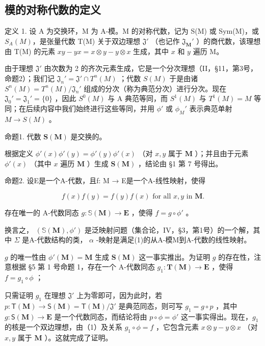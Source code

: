 \subsection{模的对称代数的定义}

定义 1. 设 A 为交换环，M 为 A-模。M 的对称代数，记为 S(M) 或 Sym(M)，或 \(S_{A}(M)\)，是张量代数 T(M) 关于双边理想 \(\mathfrak{J}'\) （也记作 \(\mathfrak{J}_{\mathbf{M}}'\) ）的商代数，该理想由 T(M) 的元素 \(xy - yx = x \otimes y - y \otimes x\) 生成，其中 \(x\) 和 \(y\) 遍历 M。

由于理想 \(\mathfrak{J}'\) 由次数为 2 的齐次元素生成，它是一个分次理想（II，§11，第3号，命题2）；我们记 \(\mathfrak{J}_n' = \mathfrak{J}' \cap T^n(M)\) ；代数 \(S(M)\) 于是由诸 \(S^n(M) = T^n(M)/\mathfrak{J}_n'\) 组成的分次（称为典范分次）进行分次。现在 \(\mathfrak{J}_0' = \mathfrak{J}_1' = \{0\}\) ，因此 \(S^0(M)\) 与 A 典范等同，而 \(S^1(M)\) 与 \(T^1(M) = M\) 等同；在后续内容中我们始终进行这些等同，并用 \(\phi'\) 或 \(\phi_M'\) 表示典范单射 \(M \to S(M)\) 。

命题1. 代数 \(\mathbf{S}(\mathbf{M})\) 是交换的。

根据定义 \(\phi'(x)\phi'(y) = \phi'(y)\phi'(x)\) （对 \(x, y\) 属于 \(\mathbf{M}\) ）；并且由于元素 \(\phi'(x)\) （其中 \(x\) 遍历 \(\mathbf{M}\) ）生成 \(\mathbf{S}(\mathbf{M})\) ，结论由 §1 第 7 号得出。

命题2. 设E是一个A-代数，且f: M → E是一个A-线性映射，使得

\[
f (x) f (y) = f (y) f (x) \text {   for   all   } x, y \text {   in   } \mathbf {M}.\tag{1}
\]

存在唯一的 A-代数同态 \(g \colon \mathbb{S}(\mathbf{M}) \to \mathbf{E}\) ，使得 \(f = g \circ \phi'\) 。

换言之， \((\mathbb{S}(\mathbf{M}), \phi')\) 是泛映射问题（集合论，IV，§3，第1号）的一个解，其中 \(\Sigma\) 是A-代数结构的类， \(\alpha\) -映射是满足(1)的从A-模M到A-代数的线性映射。

\(g\) 的唯一性由 \(\phi'(\mathbf{M}) = \mathbf{M}\) 生成 \(\mathbf{S}(\mathbf{M})\) 这一事实推出。为证明 \(g\) 的存在性，注意根据 §5 第 1 号命题 1，存在一个 A-代数同态 \(g_1: \mathbf{T}(\mathbf{M}) \to \mathbf{E}\) ，使得 \(f = g_1 \circ \phi\) ；

只需证明 \(g_1\) 在理想 \(\mathfrak{J}'\) 上为零即可，因为此时，若 \(p: \mathsf{T}(\mathbf{M}) \to \mathsf{S}(\mathbf{M}) = \mathsf{T}(\mathbf{M}) / \mathfrak{J}'\) 是典范同态，则可写 \(g_1 = g \circ p\) ，其中 \(g: \mathsf{S}(\mathbf{M}) \to \mathbf{E}\) 是一个代数同态，而结论将由 \(p \circ \phi = \phi'\) 这一事实得出。现在，\(g_1\) 的核是一个双边理想，由（1）及关系 \(g_1 \circ \phi = f\) ，它包含元素 \(x \otimes y - y \otimes x\) （对 \(x, y\) 属于 \(\mathbf{M}\) ）。这就完成了证明。

